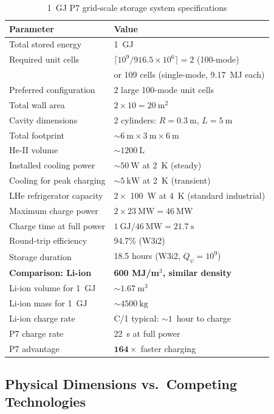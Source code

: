 \documentclass[aps,prd,twocolumn,superscriptaddress]{revtex4-2}
\begin{document}
\begin{table}[h]
\centering
\caption{1~GJ P7 grid-scale storage system specifications}
\label{tab:gridscale}
\begin{tabular}{ll}
\toprule
Parameter & Value \\
\midrule
Total stored energy & 1~GJ \\
Required unit cells & $\lceil 10^9 / 916.5\times 10^6 \rceil = 2$ (100-mode) \\
 & or 109 cells (single-mode, 9.17~MJ each) \\
Preferred configuration & 2 large 100-mode unit cells \\
Total wall area & $2\times 10 = 20~\mathrm{m^2}$ \\
Cavity dimensions & 2 cylinders: $R=0.3~\mathrm{m}$, $L=5~\mathrm{m}$ \\
Total footprint & $\sim 6~\mathrm{m}\times 3~\mathrm{m}\times 6~\mathrm{m}$ \\
He-II volume & $\sim 1200~\mathrm{L}$ \\
Installed cooling power & $\sim 50~\mathrm{W}$ at 2~K (steady) \\
Cooling for peak charging & $\sim 5~\mathrm{kW}$ at 2~K (transient) \\
LHe refrigerator capacity & $2\times$ 100~W at 4~K (standard industrial) \\
Maximum charge power & $2\times 23~\mathrm{MW} = 46~\mathrm{MW}$ \\
Charge time at full power & $1~\mathrm{GJ}/46~\mathrm{MW} = 21.7~\mathrm{s}$ \\
Round-trip efficiency & 94.7\% (W3i2) \\
Storage duration & 18.5 hours (W3i2, $Q_\psi = 10^9$) \\
\midrule
\textbf{Comparison: Li-ion} & \textbf{600 MJ/m$^3$, similar density} \\
Li-ion volume for 1~GJ & $\sim 1.67~\mathrm{m^3}$ \\
Li-ion mass for 1~GJ & $\sim 4500~\mathrm{kg}$ \\
Li-ion charge rate & C/1 typical: $\sim 1$~hour to charge \\
P7 charge rate & 22~s at full power \\
P7 advantage & $\mathbf{164\times}$ faster charging \\
\bottomrule
\end{tabular}
\end{table}

\subsection{Physical Dimensions vs.\ Competing Technologies}
\end{document}

